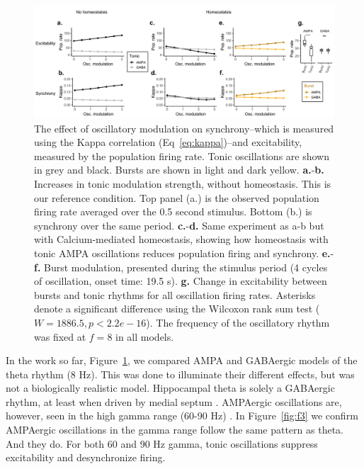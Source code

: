 \documentclass{article}
\begin{document}
\begin{figure}
\centering
\includegraphics[width=1\textwidth]{fig2.png}
\caption{\label{fig:f2}
    The effect of oscillatory modulation on synchrony--which is measured using the Kappa correlation (Eq~\ref{eq:kappa})--and excitability, measured by the population firing rate. Tonic oscillations are shown in grey and black. Bursts are shown in light and dark yellow.
    \textbf{a.}-\textbf{b.} Increases in tonic modulation strength, without homeostasis. This is our reference condition. Top panel (a.) is the observed population firing rate averaged over the 0.5 second stimulus. Bottom (b.) is synchrony over the same period.
    \textbf{c.}-\textbf{d.} Same experiment as a-b but with Calcium-mediated homeostasis, showing how homeostasis with tonic AMPA oscillations reduces population firing and synchrony.
    \textbf{e.}-\textbf{f.} Burst modulation, presented during the stimulus period (4 cycles of oscillation, onset time: 19.5 s).
    \textbf{g.} Change in excitability between bursts and tonic rhythms for all oscillation firing rates. Asterisks denote a significant difference using the Wilcoxon rank sum test ($W = 1886.5, p < 2.2e-16$). The frequency of the oscillatory rhythm was fixed at $f = 8$ in all models.}
\end{figure}

In the work so far, Figure~\ref{fig:f2}, we compared AMPA and GABAergic models of the theta rhythm (8 Hz). This was done to illuminate their different effects, but was not a biologically realistic model. Hippocampal theta is solely a GABAergic rhythm, at least when driven by medial septum \cite{Colgin2016a}. AMPAergic oscillations are, however, seen in the high gamma range (60-90 Hz) \cite{Csicsvari2003,Colgin2016,}. In Figure~\ref{fig:f3} we confirm AMPAergic oscillations in the gamma range follow the same pattern as theta. And they do. For both 60 and 90 Hz gamma, tonic oscillations suppress excitability and desynchronize firing. 
\end{document}
